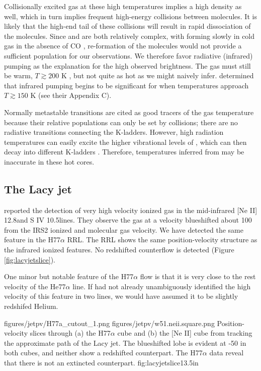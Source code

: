 Collisionally excited gas at these high temperatures implies a high density as
well, which in turn implies frequent high-energy collisions between molecules.
It is likely that the high-end tail of these collisions will result in rapid
dissociation of the molecules.  Since \formaldehyde and \ammonia are both
relatively complex, with \ammonia forming slowly in cold gas in the absence of
CO , re-formation of the molecules would not provide a
sufficient population for our observations.  We therefore favor radiative
(infrared) pumping as the explanation for the high observed brightness.  The gas
must still be warm, $T\gtrsim200$ K \citep{Henkel2013a}, but not quite as hot
as we might naively infer.  \citet{Mangum1993a} determined that infrared
pumping begins to be significant for \formaldehyde when temperatures approach
$T\gtrsim150$ K (see their Appendix C).

Normally \ammonia metastable transitions are cited as good tracers of the gas
temperature because their relative populations can only be set by collisions;
there are no radiative transitions connecting the K-ladders.  However, high
radiation temperatures can easily excite the higher vibrational levels of
\ammonia, which can then decay into different K-ladders \citep[][gives an
overview of the selection pseudo-rules]{Henkel2013a}.  Therefore, temperatures
inferred from \ammonia may be inaccurate in these hot cores.

\subsection{The Lacy jet}
\citet{Lacy2007a} reported the detection of very high velocity ionized gas
in the mid-infrared [Ne II] 12.8\um and S IV 10.5\um lines.  They observe the
gas at a velocity blueshifted about 100 \kms from the IRS2 ionized and molecular
gas velocity.  We have detected the same feature in the H77$\alpha$ RRL.
The RRL shows the same position-velocity structure as the infrared ionized
features.  No redshifted counterflow is detected (Figure \ref{fig:lacyjetslice}).

One minor but notable feature of the H77$\alpha$ flow is that it is very close
to the rest velocity of the He77$\alpha$ line.  If \citet{Lacy2007a} had not
already unambiguously identified the high velocity of this feature in two
lines, we would have assumed it to be slightly redshifed Helium.

\FigureTwo
{figures/jetpv/H77a_cutout_1.png}
{figures/jetpv/w51.neii.square.png}
{Position-velocity slices through (a) the H77$\alpha$ cube and (b) the [Ne II]
cube from \citet{Lacy2007a} tracking the approximate path of the Lacy jet.  The
blueshifted lobe is evident at -50 \kms in both cubes, and neither show a
redshifted counterpart.  The H77$\alpha$ data reveal that there is not an
extincted counterpart.}
{fig:lacyjetslice}{1}{3.5in}

